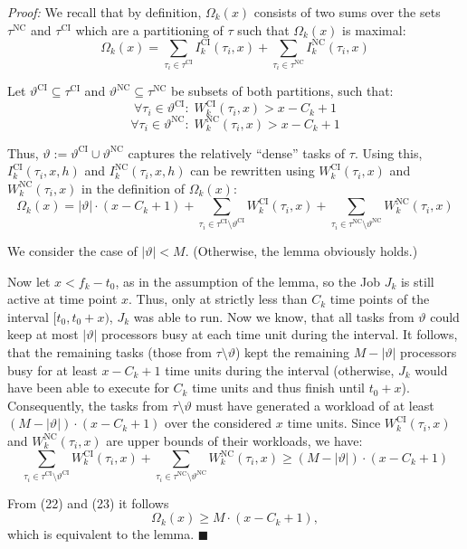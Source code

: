 \textit{Proof:} We recall that by definition, $\Omega_k(x)$ consists of two sums over the sets $\tau^{\mathrm{NC}}$ and $\tau^{\mathrm{CI}}$ which are a partitioning of $\tau$ such that $\Omega_k(x)$ is maximal:
\[
\Omega_k(x)=\sum_{\tau_i\in\tau^{\mathrm{CI}}} I_k^{\mathrm{CI}}(\tau_i,x)+\sum_{\tau_i\in\tau^{\mathrm{NC}}} I_k^{\mathrm{NC}}(\tau_i,x)
\]

Let $\vartheta^{\mathrm{CI}} \subseteq \tau^{\mathrm{CI}}$ and $\vartheta^{\mathrm{NC}} \subseteq \tau^{\mathrm{NC}}$ be subsets of both partitions, such that:
\[
\forall \tau_i \in \vartheta^{\mathrm{CI}}:\; W_k^{\mathrm{CI}}(\tau_i,x) > x-C_k+1
\]
\[
\forall \tau_i \in \vartheta^{\mathrm{NC}}:\; W_k^{\mathrm{NC}}(\tau_i,x) > x-C_k+1
\]

Thus, $\vartheta := \vartheta^{\mathrm{CI}} \cup \vartheta^{\mathrm{NC}}$ captures the relatively ``dense'' tasks of $\tau$. Using this, $I_k^{\mathrm{CI}}(\tau_i,x,h)$ and $I_k^{\mathrm{NC}}(\tau_i,x,h)$ can be rewritten using $W_k^{\mathrm{CI}}(\tau_i,x)$ and $W_k^{\mathrm{NC}}(\tau_i,x)$ in the definition of $\Omega_k(x)$:
\[
\Omega_k(x)=|\vartheta|\cdot(x-C_k+1)
+\sum_{\tau_i\in\tau^{\mathrm{CI}}\setminus\vartheta^{\mathrm{CI}}} W_k^{\mathrm{CI}}(\tau_i,x)
+\sum_{\tau_i\in\tau^{\mathrm{NC}}\setminus\vartheta^{\mathrm{NC}}} W_k^{\mathrm{NC}}(\tau_i,x)
\tag{22}
\]

We consider the case of $|\vartheta|<M$. (Otherwise, the lemma obviously holds.)

Now let $x<f_k-t_0$, as in the assumption of the lemma, so the Job $J_k$ is still active at time point $x$. Thus, only at strictly less than $C_k$ time points of the interval $[t_0,t_0+x)$, $J_k$ was able to run. Now we know, that all tasks from $\vartheta$ could keep at most $|\vartheta|$ processors busy at each time unit during the interval. It follows, that the remaining tasks (those from $\tau\setminus\vartheta$) kept the remaining $M-|\vartheta|$ processors busy for at least $x-C_k+1$ time units during the interval (otherwise, $J_k$ would have been able to execute for $C_k$ time units and thus finish until $t_0+x$). Consequently, the tasks from $\tau\setminus\vartheta$ must have generated a workload of at least $(M-|\vartheta|)\cdot(x-C_k+1)$ over the considered $x$ time units. Since $W_k^{\mathrm{CI}}(\tau_i,x)$ and $W_k^{\mathrm{NC}}(\tau_i,x)$ are upper bounds of their workloads, we have:
\[
\sum_{\tau_i\in\tau^{\mathrm{CI}}\setminus\vartheta^{\mathrm{CI}}} W_k^{\mathrm{CI}}(\tau_i,x)
+\sum_{\tau_i\in\tau^{\mathrm{NC}}\setminus\vartheta^{\mathrm{NC}}} W_k^{\mathrm{NC}}(\tau_i,x)
\geq (M-|\vartheta|)\cdot(x-C_k+1)
\tag{23}
\]

From (22) and (23) it follows
\[
\Omega_k(x)\geq M\cdot(x-C_k+1),
\]
which is equivalent to the lemma. \hfill $\blacksquare$